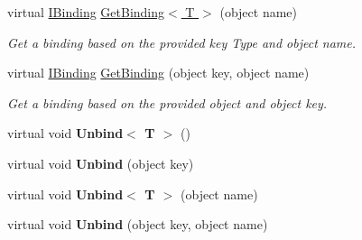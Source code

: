 \begin{DoxyCompactItemize}
\item 
\hypertarget{classbabel_1_1framework_1_1impl_1_1_binder_af43cd4f43e50d1e28af2ed93955721c5}{virtual \hyperlink{interfacebabel_1_1framework_1_1api_1_1_i_binding}{I\-Binding} \hyperlink{classbabel_1_1framework_1_1impl_1_1_binder_af43cd4f43e50d1e28af2ed93955721c5}{Get\-Binding$<$ T $>$} (object name)}\label{classbabel_1_1framework_1_1impl_1_1_binder_af43cd4f43e50d1e28af2ed93955721c5}

\begin{DoxyCompactList}\small\item\em Get a binding based on the provided key Type and object name. \end{DoxyCompactList}\item 
\hypertarget{classbabel_1_1framework_1_1impl_1_1_binder_a2cab275eb556701d9a3248ebe7aea4dd}{virtual \hyperlink{interfacebabel_1_1framework_1_1api_1_1_i_binding}{I\-Binding} \hyperlink{classbabel_1_1framework_1_1impl_1_1_binder_a2cab275eb556701d9a3248ebe7aea4dd}{Get\-Binding} (object key, object name)}\label{classbabel_1_1framework_1_1impl_1_1_binder_a2cab275eb556701d9a3248ebe7aea4dd}

\begin{DoxyCompactList}\small\item\em Get a binding based on the provided object and object key. \end{DoxyCompactList}\item 
\hypertarget{classbabel_1_1framework_1_1impl_1_1_binder_a3e5f98277c697d135c8f07466848144d}{virtual void {\bfseries Unbind$<$ T $>$} ()}\label{classbabel_1_1framework_1_1impl_1_1_binder_a3e5f98277c697d135c8f07466848144d}

\item 
\hypertarget{classbabel_1_1framework_1_1impl_1_1_binder_a8ea76c7ed16acbee9308dc033d376f35}{virtual void {\bfseries Unbind} (object key)}\label{classbabel_1_1framework_1_1impl_1_1_binder_a8ea76c7ed16acbee9308dc033d376f35}

\item 
\hypertarget{classbabel_1_1framework_1_1impl_1_1_binder_ac87a2ed62dfee335e117eb156aaacba4}{virtual void {\bfseries Unbind$<$ T $>$} (object name)}\label{classbabel_1_1framework_1_1impl_1_1_binder_ac87a2ed62dfee335e117eb156aaacba4}

\item 
\hypertarget{classbabel_1_1framework_1_1impl_1_1_binder_a424fb765addf2aa068d9f6e728dbfb4e}{virtual void {\bfseries Unbind} (object key, object name)}\label{classbabel_1_1framework_1_1impl_1_1_binder_a424fb765addf2aa068d9f6e728dbfb4e}


\end{DoxyCompactItemize}
